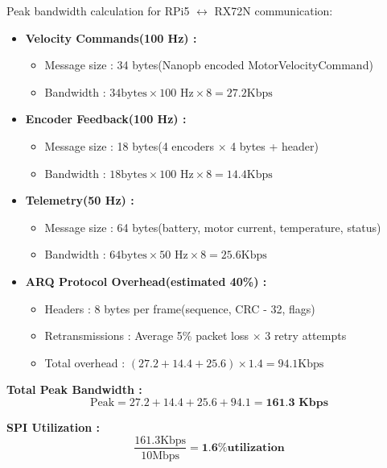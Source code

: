 Peak bandwidth calculation for RPi5 $\leftrightarrow$ RX72N communication:
\begin{itemize}
\item \textbf{Velocity Commands(100 Hz) :}
\begin{itemize}
\item Message size : 34 bytes(Nanopb encoded MotorVelocityCommand)
        \item Bandwidth : $34 \text {
  bytes
}
\times 100 \text { Hz}
\times 8 = 27.2 \text{Kbps} $
    \end{itemize}

\item \textbf{Encoder Feedback(100 Hz) :}
\begin{itemize}
\item Message size : 18 bytes(4 encoders $\times$ 4 bytes + header)
        \item Bandwidth : $18 \text {
  bytes
}
\times 100 \text { Hz}
\times 8 = 14.4 \text{Kbps} $
    \end{itemize}

\item \textbf{Telemetry(50 Hz) :}
\begin{itemize}
\item Message size : 64 bytes(battery, motor current, temperature, status)
        \item Bandwidth : $64 \text {
  bytes
}
\times 50 \text { Hz}
\times 8 = 25.6 \text{Kbps} $
    \end{itemize}

\item \textbf{ARQ Protocol Overhead(estimated 40\%) :}
\begin{itemize}
\item Headers : 8 bytes per frame(sequence, CRC - 32, flags)
        \item Retransmissions : Average 5\% packet loss $\times$
                                 3 retry attempts
        \item Total overhead : $(27.2 + 14.4 + 25.6) \times
                                1.4 = 94.1 \text{Kbps} $
    \end{itemize}
\end{itemize}

\textbf{Total Peak Bandwidth :} $$\text{Peak} = 27.2 + 14.4 + 25.6 +
                                                 94.1 = \textbf{161.3 Kbps} $$

\textbf{SPI Utilization :
} $$\frac{161.3 \text{Kbps}} {10 \text{Mbps}} = \textbf{1.6\% utilization} $$

